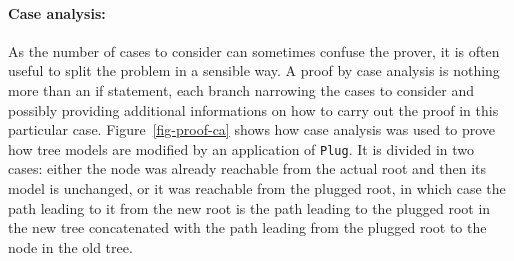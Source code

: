 \documentclass{llncs}
\begin{document}
\paragraph{Case analysis:}
As the number of cases to consider can sometimes confuse the prover, it is often useful to split the
problem in a sensible way. A proof by case analysis is nothing more than an if statement, each branch
narrowing the cases to consider and possibly providing additional informations on how to carry out
the proof in this particular case. Figure~\ref{fig-proof-ca} shows how case analysis was used to
prove how tree models are modified by an application of \texttt{Plug}. It is divided in two cases: either
the node was already reachable from the actual root and then its model is unchanged, or it was reachable
from the plugged root, in which case the path leading to it from the new root is the path leading to
the plugged root in the new tree concatenated with the path leading from the plugged root to the node
in the old tree.
\end{document}
